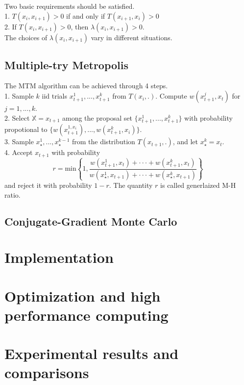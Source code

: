 \documentclass{article} %
\begin{document}
Two basic requirements should be satisfied.\\
1. $T(x_i,x_{i+1})  > 0$ if and only if $T(x_{i+1},x_i)  > 0$\\
2. If $T(x_i,x_{i+1})  > 0$, then $\lambda (x_i,x_{i+1}) >0$.\\
The choices of $\lambda (x_i,x_{i+1})$ vary in different situations. 


\subsection{Multiple-try Metropolis}
The MTM algorithm can be achieved through 4 steps.\\
1. Sample $k$ iid trials $x_{t+1}^{1},..., x_{t+1}^{k}$ from $T(x_i, .)$. Compute $w(x_{t+1}^{j},x_{t})$ for $j=1,...,k$.\\
2. Select $\mathbb{X} = x_{t+1}$ among the proposal set $\{x_{t+1}^{1},..., x_{t+1}^{k}\}$ with probability propotional to $\{w(x_{t+1}^{1,x_i}),...,w(x_{t+1}^{k},x_i)\}$.\\
3. Sample $x_{\star}^{1},...,x_{\star}^{k-1}$ from the distribution $T(x_{t+1},.)$, and let $x_{\star}^{k}=x_{t}$.\\
4. Accept $x_{t+1}$ with probability 
\begin{equation}
r = \text{min}\left\{ 1, \frac{w(x_{t+1}^{1},x_{t})+\cdot \cdot \cdot+w(x_{t+1}^{k},x_{t})} {w(x_{\star}^{1},x_{t+1})+\cdot \cdot \cdot+w(x_{\star}^{k},x_{t+1})} \right\}
\end{equation}
and reject it with probability $1-r$. The quantity $r$ is called generlaized M-H ratio. 
\subsection{Conjugate-Gradient Monte Carlo}




\section{Implementation}



\section{Optimization and high performance computing}



\section{Experimental results and comparisons}
\end{document}
